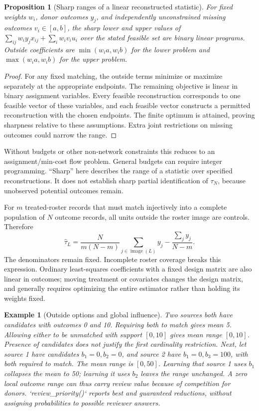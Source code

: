 \documentclass[11pt]{article}
\newtheorem{proposition}{Proposition}
\newtheorem{example}{Example}
\begin{document}
\begin{proposition}[Sharp ranges of a linear reconstructed statistic]
For fixed weights $w_i$, donor outcomes $y_j$, and independently unconstrained missing
outcomes $v_i\in[a,b]$, the sharp lower and upper values of
$\sum_{ij}w_i y_jx_{ij}+\sum_iw_iv_iu_i$ over the stated feasible set are binary
linear programs. Outside coefficients are $\min(w_i a,w_i b)$ for the lower problem
and $\max(w_i a,w_i b)$ for the upper problem.
\end{proposition}
\begin{proof}
For any fixed matching, the outside terms minimize or maximize separately at the
appropriate endpoints. The remaining objective is linear in binary assignment
variables. Every feasible reconstruction corresponds to one feasible vector of these
variables, and each feasible vector constructs a permitted reconstruction with the
chosen endpoints. The finite optimum is attained, proving sharpness relative to these
assumptions. Extra joint restrictions on missing outcomes could narrow the range.
\end{proof}
Without budgets or other non-network constraints this reduces to an assignment/min-cost
flow problem. General budgets can require integer programming. ``Sharp'' here describes
the range of a statistic over specified reconstructions. It does not establish sharp
partial identification of $\tau_N$, because unobserved potential outcomes remain.

For $m$ treated-roster records that must match injectively into a complete population
of $N$ outcome records, all units outside the roster image are controls. Therefore
\[
 \widehat\tau_L=\frac{N}{m(N-m)}\sum_{j\in\operatorname{image}(L)}y_j
                  -\frac{\sum_jy_j}{N-m}.
\]
The denominators remain fixed. Incomplete roster coverage breaks this expression.
Ordinary least-squares coefficients with a fixed design matrix are also linear in
outcomes; moving treatment or covariates changes the design matrix, and generally
requires optimizing the entire estimator rather than holding its weights fixed.

\begin{example}[Outside options and global influence]
Two sources both have candidates with outcomes 0 and 10. Requiring both to match gives
mean 5. Allowing either to be unmatched with support $[0,10]$ gives mean range $[0,10]$.
Presence of candidates does not justify the first cardinality restriction.
Next, let source 1 have candidates $b_1=0,b_2=0$, and source 2 have
$b_1=0,b_3=100$, with both required to match. The mean range is $[0,50]$.
Learning that source 1 uses $b_1$ collapses the mean to 50; learning it uses $b_2$ leaves
the range unchanged. A zero local outcome range can thus carry review value because
of competition for donors. `review\_priority()` reports best and guaranteed reductions,
without assigning probabilities to possible reviewer answers.
\end{example}
\end{document}
